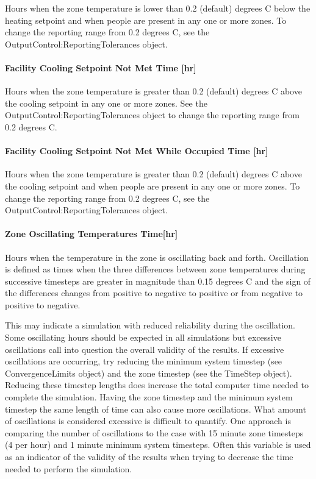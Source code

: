 Hours when the zone temperature is lower than 0.2 (default) degrees C below the heating setpoint and when people are present in any one or more zones. To change the reporting range from 0.2 degrees C, see the OutputControl:ReportingTolerances object.

\paragraph{Facility Cooling Setpoint Not Met Time {[}hr{]}}\label{facility-cooling-setpoint-not-met-time-hr}

Hours when the zone temperature is greater than 0.2 (default) degrees C above the cooling setpoint in any one or more zones. See the OutputControl:ReportingTolerances object to change the reporting range from 0.2 degrees C.

\paragraph{Facility Cooling Setpoint Not Met While Occupied Time {[}hr{]}}\label{facility-cooling-setpoint-not-met-while-occupied-time-hr}

Hours when the zone temperature is greater than 0.2 (default) degrees C above the cooling setpoint and when people are present in any one or more zones. To change the reporting range from 0.2 degrees C, see the OutputControl:ReportingTolerances object.

\paragraph{Zone Oscillating Temperatures Time{[}hr{]}}\label{zone-oscillating-temperatures-timehr}

Hours when the temperature in the zone is oscillating back and forth. Oscillation is defined as times when the three differences between zone temperatures during successive timesteps are greater in magnitude than 0.15 degrees C and the sign of the differences changes from positive to negative to positive or from negative to positive to negative.

This may indicate a simulation with reduced reliability during the oscillation. Some oscillating hours should be expected in all simulations but excessive oscillations call into question the overall validity of the results. If excessive oscillations are occurring, try reducing the minimum system timestep (see ConvergenceLimits object) and the zone timestep (see the TimeStep object). Reducing these timestep lengths does increase the total computer time needed to complete the simulation. Having the zone timestep and the minimum system timestep the same length of time can also cause more oscillations. What amount of oscillations is considered excessive is difficult to quantify. One approach is comparing the number of oscillations to the case with 15 minute zone timesteps (4 per hour) and 1 minute minimum system timesteps. Often this variable is used as an indicator of the validity of the results when trying to decrease the time needed to perform the simulation.

